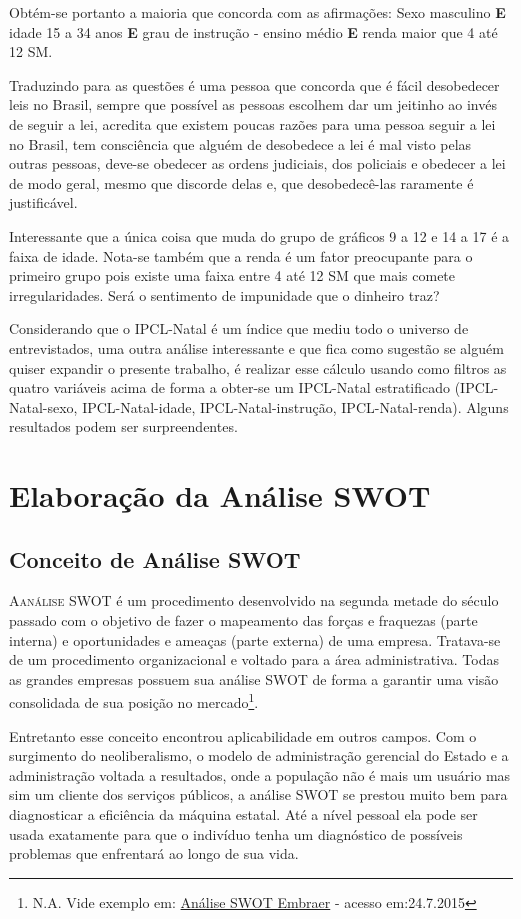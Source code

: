 \documentclass[
	12pt,				%
	openright,			%
	twoside,			%
	a4paper,			%
	chapter=TITLE,		%
	section=TITLE,		%
	subsection=TITLE,	%
	subsubsection=TITLE,%
	spanish,            %
	english,			%
	brazil				%
	]{abntex2}
\begin{document}
\par
Obtém-se portanto a maioria que concorda com as afirmações:
Sexo masculino \textbf{E} idade 15 a 34 anos \textbf{E} grau de instrução - ensino médio \textbf{E} renda maior que 4 até 12 SM.
\par
Traduzindo para as questões é uma pessoa que concorda que é fácil desobedecer leis no Brasil, sempre que possível as pessoas escolhem dar um jeitinho ao invés de seguir a lei, acredita que existem poucas razões para uma pessoa seguir a lei no Brasil, tem consciência que alguém de desobedece a lei é mal visto pelas outras pessoas, deve-se obedecer as ordens judiciais, dos policiais e obedecer a lei de modo geral, mesmo que discorde delas e, que desobedecê-las raramente é justificável.
\par
Interessante que a única coisa que muda do grupo de gráficos 9 a 12 e 14 a 17 é a faixa de idade. Nota-se também que a renda é um fator preocupante para o primeiro grupo pois existe uma faixa entre 4 até 12 SM que mais comete irregularidades. Será o sentimento de impunidade que o dinheiro traz?
\par
Considerando que o IPCL-Natal é um índice que mediu todo o universo de entrevistados, uma outra análise interessante e que fica como sugestão se alguém quiser expandir o presente trabalho, é realizar esse cálculo usando como filtros as quatro variáveis acima de forma a obter-se um IPCL-Natal estratificado (IPCL-Natal-sexo, IPCL-Natal-idade, IPCL-Natal-instrução, IPCL-Natal-renda). Alguns resultados podem ser surpreendentes.

\chapter{Elaboração da Análise SWOT}
\section{Conceito de Análise SWOT}
\lettrine[lines=2, lhang=0.33, loversize=0.25]{A} {análise} SWOT é um procedimento desenvolvido na segunda metade do século passado com o objetivo de fazer o mapeamento das
forças e fraquezas (parte interna) e oportunidades e ameaças (parte externa) de uma empresa. Tratava-se de um procedimento organizacional
e voltado para a área administrativa. Todas as grandes empresas possuem sua análise SWOT de forma a garantir uma visão consolidada
de sua posição no mercado\footnote{N.A. Vide exemplo em: \href{http://www.freeswotanalysis.com/aerospace-airline/642-embraer-swot-analysis.html}{Análise SWOT Embraer} - acesso em:24.7.2015}.
\par
Entretanto esse conceito encontrou aplicabilidade em outros campos. Com o surgimento do neoliberalismo, o modelo de administração gerencial do Estado e a administração voltada a resultados, onde a população não é mais um usuário mas sim um cliente dos serviços públicos, a análise SWOT se prestou muito bem para diagnosticar a eficiência da máquina estatal. Até a nível pessoal ela pode ser usada exatamente para que o indivíduo
tenha um diagnóstico de possíveis problemas que enfrentará ao longo de sua vida.
\end{document}
